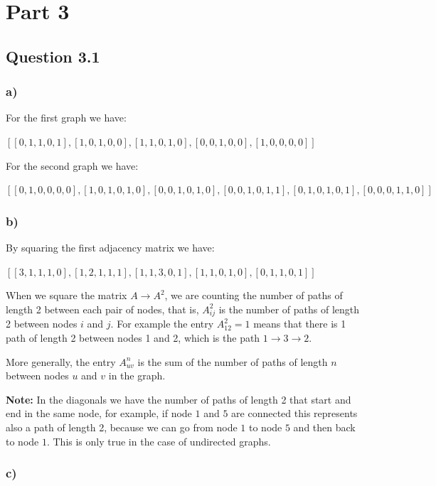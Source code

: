 \documentclass{article}
\begin{document}
\newpage

\section*{Part 3}

\subsection*{Question 3.1}

\subsubsection*{a)}

For the first graph we have:

$[
[0, 1, 1, 0, 1],
[1, 0, 1, 0, 0],
[1, 1, 0, 1, 0],
[0, 0, 1, 0, 0],
[1, 0, 0, 0, 0]]$

For the second graph we have:

$[
[0, 1, 0, 0, 0, 0],
[1, 0, 1, 0, 1, 0],
[0, 0, 1, 0, 1, 0],
[0, 0, 1, 0, 1, 1],
[0, 1, 0, 1, 0, 1], 
[0, 0, 0, 1, 1, 0]]$

\subsubsection*{b)}

By squaring the first adjacency matrix we have:

$[
[3, 1, 1, 1, 0],
[1, 2, 1, 1, 1],
[1, 1, 3, 0, 1],
[1, 1, 0, 1, 0],
[0, 1, 1, 0, 1]]$

When we square the matrix $A \rightarrow A^2$, we are counting the number of paths of length 2 between each pair of nodes,
that is, $A_{ij}^2$ is the number of paths of length 2 between nodes $i$ and $j$.
For example the entry $A_{12}^2 = 1$ means that there is 1 path of length 2 between nodes 1 and 2, which is the path
$1 \rightarrow 3 \rightarrow 2$.

More generally, the entry $A_{uv}^n$ is the sum of the number of paths of length $n$ between nodes $u$ and $v$ in the graph.

\textbf{Note:} In the diagonals we have the number of paths of length 2 that start and end in the same node, for example,
if node $1$ and $5$ are connected this represents also a path of length 2, because we can go from node $1$ to node $5$ and
then back to node $1$. This is only true in the case of undirected graphs.

\subsubsection*{c)}
\end{document}
